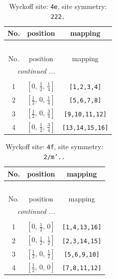 \documentclass[fleqn,8pt]{jsarticle}
\begin{document}
\begin{longtable}{ccc}
\caption{Wyckoff site: {\tt 4e}, site symmetry: {\tt 222.}}
 \\
 \hline \hline
No. & position & mapping \\ \hline \endfirsthead

\multicolumn{2}{l}{\tablename\ \thetable{}} \\
 \hline \hline
No. & position & mapping \\ \hline \endhead

 \hline \hline
\multicolumn{2}{r}{\footnotesize\it continued ...} \\ \endfoot

 \hline \hline
\multicolumn{2}{r}{} \\ \endlastfoot

1 & $\left[ 0,\, \frac{1}{2},\, \frac{1}{4} \right]$ & {\tt [1,2,3,4]} \\ \hline
2 & $\left[ \frac{1}{2},\, 0,\, \frac{1}{4} \right]$ & {\tt [5,6,7,8]} \\ \hline
3 & $\left[ \frac{1}{2},\, 0,\, \frac{3}{4} \right]$ & {\tt [9,10,11,12]} \\ \hline
4 & $\left[ 0,\, \frac{1}{2},\, \frac{3}{4} \right]$ & {\tt [13,14,15,16]} \\
\end{longtable}
\renewcommand{\arraystretch}{1.2}
\begin{longtable}{ccc}
\caption{Wyckoff site: {\tt 4f}, site symmetry: {\tt 2/m'..}}
 \\
 \hline \hline
No. & position & mapping \\ \hline \endfirsthead

\multicolumn{2}{l}{\tablename\ \thetable{}} \\
 \hline \hline
No. & position & mapping \\ \hline \endhead

 \hline \hline
\multicolumn{2}{r}{\footnotesize\it continued ...} \\ \endfoot

 \hline \hline
\multicolumn{2}{r}{} \\ \endlastfoot

1 & $\left[ 0,\, \frac{1}{2},\, 0 \right]$ & {\tt [1,4,13,16]} \\ \hline
2 & $\left[ 0,\, \frac{1}{2},\, \frac{1}{2} \right]$ & {\tt [2,3,14,15]} \\ \hline
3 & $\left[ \frac{1}{2},\, 0,\, \frac{1}{2} \right]$ & {\tt [5,6,9,10]} \\ \hline
4 & $\left[ \frac{1}{2},\, 0,\, 0 \right]$ & {\tt [7,8,11,12]} \\
\end{longtable}
\end{document}
